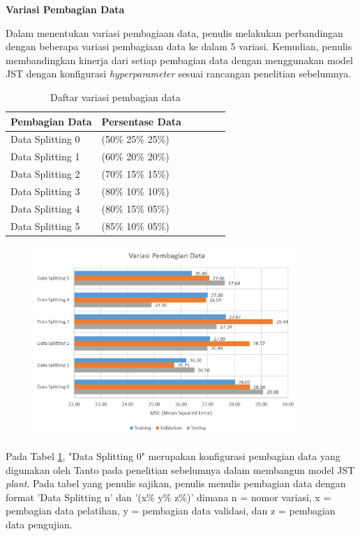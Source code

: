 \noindent \textbf{Variasi Pembagian Data} 

Dalam menentukan variasi pembagiaan data, penulis melakukan perbandingan dengan beberapa variasi pembagiaan data ke dalam 5 variasi. Kemudian, penulis membandingkan kinerja dari setiap pembagian data dengan menggunakan model JST dengan konfigurasi \textit{hyperparameter} sesuai rancangan penelitian sebelumnya\cite{skripsiTanto}.

\begin{table}[h!]
	\caption{Daftar variasi pembagian data}
	\label{tbl:5:DataSplitting}
	\centering
	\begin{tabular}{|p{3cm}|p{3cm}|p{1.5cm}|p{1cm}|p{1.5cm}|p{1cm}|}
		\hline
		Pembagian Data   & Persentase Data \\ \hline
		Data Splitting 0 & (50\% 25\% 25\%)\\ \hline
		Data Splitting 1 & (60\% 20\% 20\%)\\ \hline
		Data Splitting 2 & (70\% 15\% 15\%)\\ \hline
		Data Splitting 3 & (80\% 10\% 10\%)\\ \hline
		Data Splitting 4 & (80\% 15\% 05\%)\\ \hline
		Data Splitting 5 & (85\% 10\% 05\%)\\ \hline
	\end{tabular}
\end{table}

\begin{figure}[!h]
	\centering
	\includegraphics[width=0.9\textwidth]{figures/DataSplittingResult}
	\caption{}
	\label{fig:5:DataSplittingResult}
\end{figure}

Pada Tabel \ref{tbl:5:DataSplitting}, "Data Splitting 0" merupakan konfigurasi pembagian data yang digunakan oleh Tanto pada penelitian sebelumnya dalam membangun model JST \textit{plant}. Pada tabel yang penulis sajikan, penulis menulis pembagian data dengan format 'Data Splitting n' dan '(x\% y\% z\%)' dimana n = nomor variasi, x = pembagian data pelatihan, y = pembagian data validasi, dan z = pembagian data pengujian. \\

